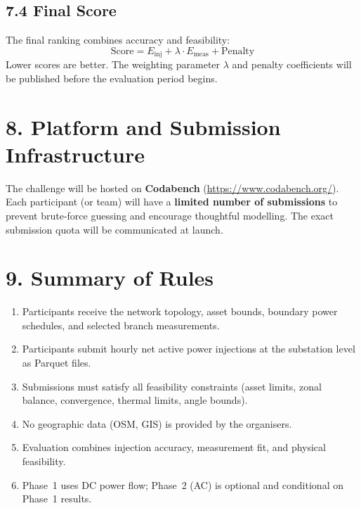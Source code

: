 \documentclass[11pt,a4paper]{article}
\begin{document}
\subsection{7.4 Final Score}

The final ranking combines accuracy and feasibility:
%
\begin{equation}
  \text{Score} = E_{\text{inj}} + \lambda \cdot E_{\text{meas}} + \text{Penalty}
\end{equation}
%
Lower scores are better. The weighting parameter $\lambda$ and penalty coefficients will be published before the evaluation period begins.

\section{8. Platform and Submission Infrastructure}

The challenge will be hosted on \textbf{Codabench} (\url{https://www.codabench.org/}). Each participant (or team) will have a \textbf{limited number of submissions} to prevent brute-force guessing and encourage thoughtful modelling. The exact submission quota will be communicated at launch.

\section{9. Summary of Rules}

\begin{enumerate}[nosep]
  \item Participants receive the network topology, asset bounds, boundary power schedules, and selected branch measurements.
  \item Participants submit hourly net active power injections at the substation level as Parquet files.
  \item Submissions must satisfy all feasibility constraints (asset limits, zonal balance, convergence, thermal limits, angle bounds).
  \item No geographic data (OSM, GIS) is provided by the organisers.
  \item Evaluation combines injection accuracy, measurement fit, and physical feasibility.
  \item Phase~1 uses DC power flow; Phase~2 (AC) is optional and conditional on Phase~1 results.
\end{enumerate}
\end{document}
